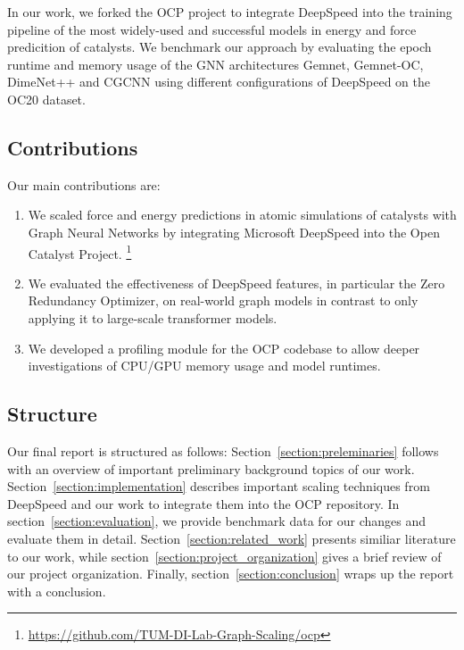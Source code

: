 In our work, we forked the OCP project to integrate DeepSpeed into the training pipeline of the most widely-used 
and successful models in energy and force predicition of catalysts. 
We benchmark our approach by evaluating the epoch runtime and memory usage of the GNN architectures Gemnet, Gemnet-OC, 
DimeNet++ and CGCNN using different configurations of DeepSpeed on the OC20 dataset.


\subsection{Contributions}

Our main contributions are:

\begin{enumerate}
    \item We scaled force and energy predictions in atomic simulations of catalysts with Graph Neural Networks 
    by integrating Microsoft DeepSpeed into the Open Catalyst Project.
    \footnote{\url{https://github.com/TUM-DI-Lab-Graph-Scaling/ocp}}
    \item We evaluated the effectiveness of DeepSpeed features, in particular the Zero Redundancy Optimizer, on 
    real-world graph models in contrast to only applying it to large-scale transformer models.
    \item We developed a profiling module for the OCP codebase to allow deeper investigations of CPU/GPU memory 
    usage and model runtimes.
\end{enumerate}

\subsection{Structure}

Our final report is structured as follows: Section~\ref{section:preleminaries} follows with an overview of 
important preliminary background topics of our work. Section~\ref{section:implementation} describes important 
scaling techniques from DeepSpeed and our work to integrate them into the OCP repository. In 
section~\ref{section:evaluation}, we provide benchmark data for our changes and evaluate them in detail. 
Section~\ref{section:related_work} presents similiar literature to our work, while section~\ref{section:project_organization} 
gives a brief review of our project organization. Finally, section~\ref{section:conclusion} wraps up the 
report with a conclusion.